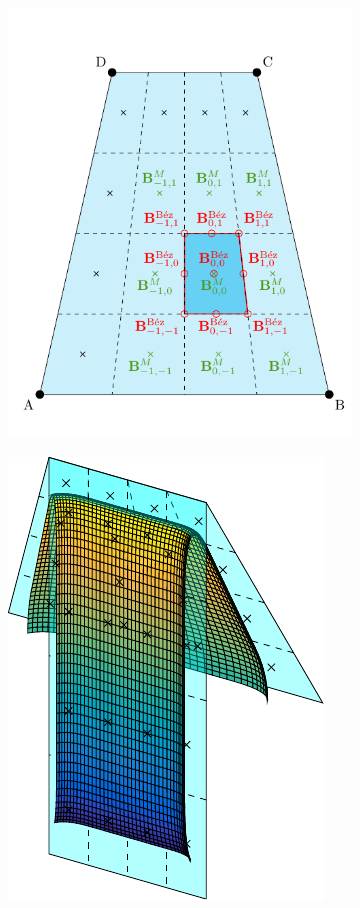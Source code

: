 \begin{figure}
\begin{center}
\begin{subfigure}{.45\textwidth}
\begin{center}
\includegraphics[height=0.8\textwidth]{Pictures/NURBS/bezier_points.pdf}
\label{subfig:peterspoints}
\end{center}
\end{subfigure}
\begin{subfigure}{.45\textwidth}
\begin{center}
\includegraphics[height=0.8\textwidth]{Pictures/NURBS/bspline_patches.pdf}

\end{center}
\end{subfigure}
\end{center}
\end{figure}
